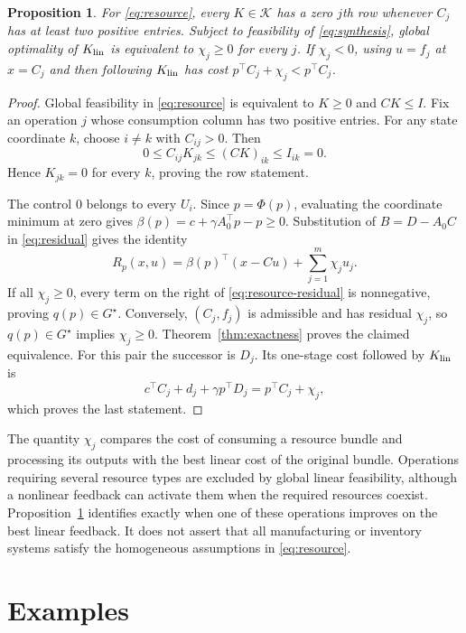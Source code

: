 \documentclass[10pt]{article}
\newtheorem{proposition}{Proposition}
\begin{document}
\begin{proposition}
\label{prop:resource}
For \eqref{eq:resource}, every $K\in\mathcal K$ has a zero $j$th row whenever $C_j$ has at least two positive entries. Subject to feasibility of \eqref{eq:synthesis}, global optimality of $K_{\rm lin}$ is equivalent to $\chi_j\ge0$ for every $j$. If $\chi_j<0$, using $u=f_j$ at $x=C_j$ and then following $K_{\rm lin}$ has cost $p^\top C_j+\chi_j<p^\top C_j$.
\end{proposition}
\begin{proof}
Global feasibility in \eqref{eq:resource} is equivalent to $K\ge0$ and $CK\le I$. Fix an operation $j$ whose consumption column has two positive entries. For any state coordinate $k$, choose $i\ne k$ with $C_{ij}>0$. Then
\[
 0\le C_{ij}K_{jk}\le(CK)_{ik}\le I_{ik}=0.
\]
Hence $K_{jk}=0$ for every $k$, proving the row statement.

The control $0$ belongs to every $U_i$. Since $p=\Phi(p)$, evaluating the coordinate minimum at zero gives $\beta(p)=c+\gamma A_0^\top p-p\ge0$. Substitution of $B=D-A_0C$ in \eqref{eq:residual} gives the identity
\begin{equation}
 R_p(x,u)=\beta(p)^\top(x-Cu)+\sum_{j=1}^m\chi_j u_j.
 \label{eq:resource-residual}
\end{equation}
If all $\chi_j\ge0$, every term on the right of \eqref{eq:resource-residual} is nonnegative, proving $q(p)\in G^\star$. Conversely, $(C_j,f_j)$ is admissible and has residual $\chi_j$, so $q(p)\in G^\star$ implies $\chi_j\ge0$. Theorem~\ref{thm:exactness} proves the claimed equivalence. For this pair the successor is $D_j$. Its one-stage cost followed by $K_{\rm lin}$ is
\[
 c^\top C_j+d_j+\gamma p^\top D_j=p^\top C_j+\chi_j,
\]
which proves the last statement.
\end{proof}

The quantity $\chi_j$ compares the cost of consuming a resource bundle and processing its outputs with the best linear cost of the original bundle. Operations requiring several resource types are excluded by global linear feasibility, although a nonlinear feedback can activate them when the required resources coexist. Proposition~\ref{prop:resource} identifies exactly when one of these operations improves on the best linear feedback. It does not assert that all manufacturing or inventory systems satisfy the homogeneous assumptions in \eqref{eq:resource}.

\section{Examples}
\end{document}
